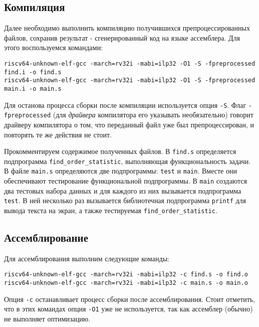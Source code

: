     
    

    \subsection{Компиляция}\label{subsec:compilation}

    Далее необходимо выполнить компиляцию получившихся препроцессированных файлов, сохранив результат - сгенерированный код на языке ассемблера. Для этого воспользуемся командами:
    \begin{Verbatim}[breaklines=true]
riscv64-unknown-elf-gcc -march=rv32i -mabi=ilp32 -O1 -S -fpreprocessed find.i -o find.s
riscv64-unknown-elf-gcc -march=rv32i -mabi=ilp32 -O1 -S -fpreprocessed main.i -o main.s
    \end{Verbatim}
    Для останова процесса сборки после компиляции используется опция \verb|-S|. Флаг \verb|-fpreprocessed| (для \textit{драйвера} компилятора его указывать необязательно) говорит драйверу компилятора о том, что переданный файл уже был препроцессирован, и повторять те же действия не стоит.

    
    \vspace{2cm}
    

    Прокомментируем содержимое полученных файлов. В \verb|find.s| определяется подпрограмма \verb|find_order_statistic|, выполняющая функциональность задачи.
    В файле \verb|main.s| определяются две подпрограммы: \verb|test| и \verb|main|. Вместе они обеспечивают тестирование функциональной подпрограммы.
    В \verb|main| создаются два тестовых набора данных и для каждого из них вызывается подпрограмма \verb|test|. В ней несколько раз вызывается библиотечная подпрограмма \verb|printf| для вывода текста на экран, а также тестируемая \verb|find_order_statistic|.
    \subsection{Ассемблирование}\label{subsec:assembly}
    Для ассемблирования выполним следующие команды:
    \begin{Verbatim}[breaklines=true]
riscv64-unknown-elf-gcc -march=rv32i -mabi=ilp32 -c find.s -o find.o
riscv64-unknown-elf-gcc -march=rv32i -mabi=ilp32 -c main.s -o main.o
    \end{Verbatim}
    Опция \verb|-c| останавливает процесс сборки после ассемблирования. Стоит отметить, что в этих командах опция \verb|-O1| уже не используется, так как ассемблер (обычно) не выполняет оптимизацию.

